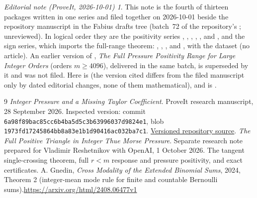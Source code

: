 \documentclass[11pt,a4paper]{article}
\theoremstyle{remark}\newtheorem*{ednote}{Editorial note (ProveIt, 2026-10-01)}
\begin{document}
\begin{ednote}
This note is the fourth of thirteen packages written in one series and filed together on 2026-10-01 beside the repository manuscript  in the Fabius drafts tree (batch~72 of the repository's ; unreviewed). In logical order they are the positivity series , , , , ,  and , and the sign series, which imports the full-range theorem: , , ,  and , with the dataset  (no article). An earlier version of , \emph{The Full Pressure Positivity Range for Large Integer Orders} (orders $m\ge4096$), delivered in the same batch, is superseded by it and was not filed.
Here \cite{integer} is  (the version cited differs from the filed manuscript only by dated editorial changes, none of them mathematical), and \cite{triangle} is
.
\end{ednote}
\begin{thebibliography}{9}\small
{}\emph{Integer Pressure and a Missing Taylor Coefficient}. ProveIt research manuscript, 28 September 2026. Inspected version: commit \nolinkurl{6a98f89bac85cc6b4ba5d5c3b63996037d9824e1}, blob \nolinkurl{1973fd17245864bb8a83e1b1d90416ac032ba7c1}.\newline
\href{https://github.com/VladimirReshetnikov/ProveIt/blob/6a98f89bac85cc6b4ba5d5c3b63996037d9824e1/Analysis/FabiusFunction/docs/semi-formalized-research-frontiers/drafts/thue-morse/Thue_Morse_Integer_Pressure/article.tex}{Versioned repository source}.
\emph{The Full Positive Triangle in Integer Thue Morse Pressure}. Separate research note prepared for Vladimir Reshetnikov with OpenAI, 1 October 2026. The tangent single-crossing theorem, full $r<m$ response and pressure positivity, and exact certificates.
 A. Gnedin, \emph{Cross Modality of the Extended Binomial Sums}, 2024, Theorem 2 (integer-mean mode rule for finite and countable Bernoulli sums).\newline\url{https://arxiv.org/html/2408.06477v1}
\end{thebibliography}
\end{document}
